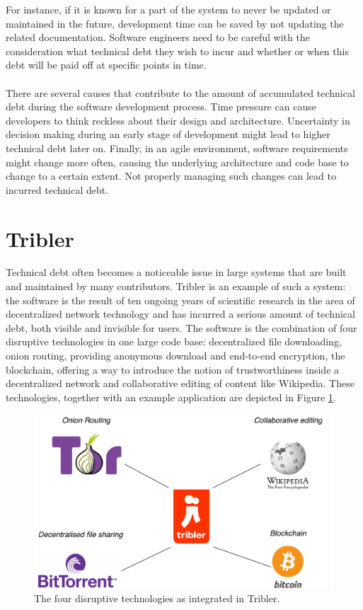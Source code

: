 For instance, if it is known for a part of the system to never be updated or maintained in the future, development time can be saved by not updating the related documentation.
Software engineers need to be careful with the consideration what technical debt they wish to incur and whether or when this debt will be paid off at specific points in time.\\\\
There are several causes that contribute to the amount of accumulated technical debt during the software development process\cite{martini2014architecture}. Time pressure can cause developers to think reckless about their design and architecture. Uncertainty in decision making during an early stage of development might lead to higher technical debt later on. Finally, in an agile environment, software requirements might change more often, causing the underlying architecture and code base to change to a certain extent. Not properly managing such changes can lead to incurred technical debt.

\section{Tribler}
Technical debt often becomes a noticeable issue in large systems that are built and maintained by many contributors. Tribler is an example of such a system: the software is the result of ten ongoing years of scientific research in the area of decentralized network technology and has incurred a serious amount of technical debt, both visible and invisible for users.
The software is the combination of four disruptive technologies in one large code base: decentralized file downloading, onion routing, providing anonymous download and end-to-end encryption, the blockchain, offering a way to introduce the notion of trustworthiness inside a decentralized network and collaborative editing of content like Wikipedia. These technologies, together with an example application are depicted in Figure \ref{fig:tribler-connections}.\\

\begin{figure}[t!]
	\centering
	\includegraphics[width=0.6\columnwidth]{images/introduction/tribler_connections}
	\caption{The four disruptive technologies as integrated in Tribler.}
	\label{fig:tribler-connections}
\end{figure}

